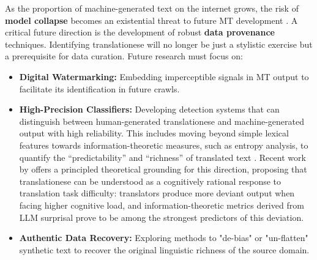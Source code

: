 \documentclass[11pt,a4paper]{article}
\begin{document}
As the proportion of machine-generated text on the internet grows, the risk of \textbf{model collapse} becomes an existential threat to future MT development \cite{shumailov2024ai}. A critical future direction is the development of robust \textbf{data provenance} techniques. Identifying translationese will no longer be just a stylistic exercise but a prerequisite for data curation. Future research must focus on:
\begin{itemize}
    \item \textbf{Digital Watermarking:} Embedding imperceptible signals in MT output to facilitate its identification in future crawls.
    \item \textbf{High-Precision Classifiers:} Developing detection systems that can distinguish between human-generated translationese and machine-generated output with high reliability. This includes moving beyond simple lexical features towards information-theoretic measures, such as entropy analysis, to quantify the ``predictability'' and ``richness'' of translated text \cite{wang2024benchmarking}. Recent work by \citet{kunilovskaya2026translationese} offers a principled theoretical grounding for this direction, proposing that translationese can be understood as a cognitively rational response to translation task difficulty: translators produce more deviant output when facing higher cognitive load, and information-theoretic metrics derived from LLM surprisal prove to be among the strongest predictors of this deviation.
    \item \textbf{Authentic Data Recovery:} Exploring methods to "de-bias" or "un-flatten" synthetic text to recover the original linguistic richness of the source domain.
\end{itemize}
\end{document}
